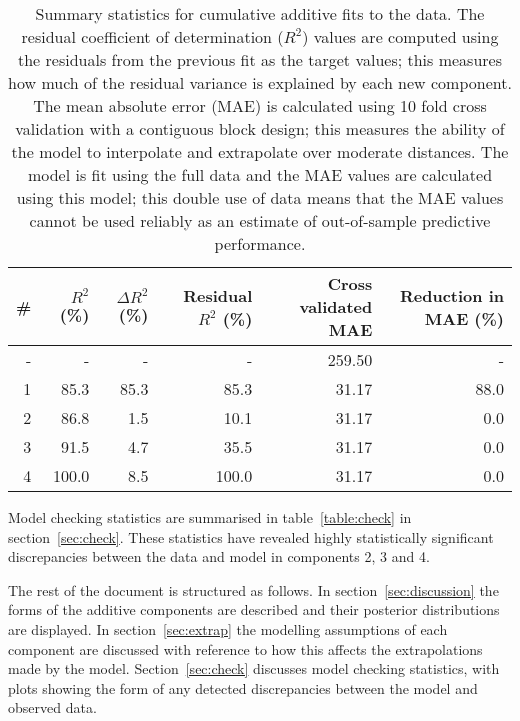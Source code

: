 \documentclass{article} %
\begin{document}
\begin{table}[htb]
\begin{center}
{\small
\begin{tabular}{|r|rrrrr|}
\hline
\bf{\#} & {$R^2$ (\%)} & {$\Delta R^2$ (\%)} & {Residual $R^2$ (\%)} & {Cross validated MAE} & Reduction in MAE (\%)\\
\hline
- & - & - & - & 259.50 & -\\

1 & 85.3 & 85.3 & 85.3 & 31.17 & 88.0\\

2 & 86.8 & 1.5 & 10.1 & 31.17 & 0.0\\

3 & 91.5 & 4.7 & 35.5 & 31.17 & 0.0\\

4 & 100.0 & 8.5 & 100.0 & 31.17 & 0.0\\

\hline
\end{tabular}
\caption{
Summary statistics for cumulative additive fits to the data.
The residual coefficient of determination ($R^2$) values are computed using the residuals from the previous fit as the target values; this measures how much of the residual variance is explained by each new component.
The mean absolute error (MAE) is calculated using 10 fold cross validation with a contiguous block design; this measures the ability of the model to interpolate and extrapolate over moderate distances.
The model is fit using the full data and the MAE values are calculated using this model; this double use of data means that the MAE values cannot be used reliably as an estimate of out-of-sample predictive performance.
}
\label{table:stats}
}
\end{center}
\end{table}

Model checking statistics are summarised in table~\ref{table:check} in section~\ref{sec:check}.
These statistics have revealed highly statistically significant discrepancies between the data and model in components 2, 3 and 4.

The rest of the document is structured as follows.
In section~\ref{sec:discussion} the forms of the additive components are described and their posterior distributions are displayed.
In section~\ref{sec:extrap} the modelling assumptions of each component are discussed with reference to how this affects the extrapolations made by the model.
Section~\ref{sec:check} discusses model checking statistics, with plots showing the form of any detected discrepancies between the model and observed data.
\end{document}
